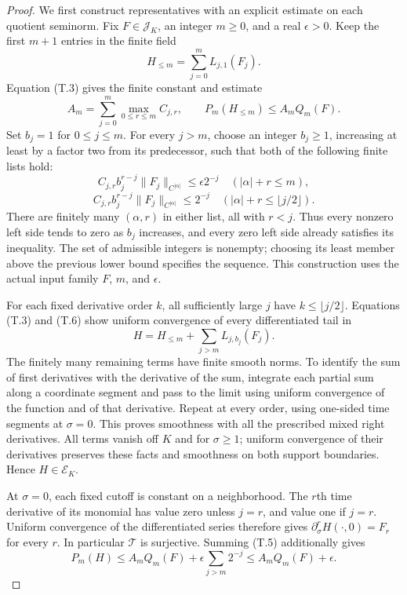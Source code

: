 \documentclass[10pt,a4paper]{article}
\newcounter{none}
\newcommand{\J}{\mathcal J_K}
\newcommand{\E}{\mathcal E_K}
\begin{document}
\begin{proof}
We first construct representatives with an explicit estimate on each quotient
seminorm. Fix $F\in\J$, an integer $m\ge0$, and a real $\epsilon>0$.
Keep the first $m+1$ entries in the finite field
\[
 H_{\le m}=\sum_{j=0}^m L_{j,1}(F_j).
\]
Equation (T.3) gives the finite constant and estimate
\[
 A_m=\sum_{j=0}^m\max_{0\le r\le m}C_{j,r},\qquad
 P_m(H_{\le m})\le A_mQ_m(F).
 \tag{T.4}
\]
Set $b_j=1$ for $0\le j\le m$. For every $j>m$, choose an integer $b_j\ge1$, increasing at least by a factor
two from its predecessor, such that both of the following finite lists hold:
\[
 C_{j,r}b_j^{r-j}\|F_j\|_{C^{|\alpha|}}
       \le\epsilon 2^{-j}\quad (|\alpha|+r\le m),
 \tag{T.5}
\]
\[
 C_{j,r}b_j^{r-j}\|F_j\|_{C^{|\alpha|}}
       \le2^{-j}\quad (|\alpha|+r\le\lfloor j/2\rfloor).
 \tag{T.6}
\]
There are finitely many $(\alpha,r)$ in either list, all with $r<j$.
Thus every nonzero left side tends to zero as $b_j$ increases, and every
zero left side already satisfies its inequality. The set of admissible
integers is nonempty; choosing its least member above the previous lower
bound specifies the sequence. This construction uses the actual input
family $F$, $m$, and $\epsilon$.

For each fixed derivative order $k$, all sufficiently large $j$ have
$k\le\lfloor j/2\rfloor$. Equations (T.3) and (T.6) show uniform
convergence of every differentiated tail in
\[
 H=H_{\le m}+\sum_{j>m}L_{j,b_j}(F_j).
 \tag{T.7}
\]
The finitely many remaining terms have finite smooth norms. To identify the
sum of first derivatives with the derivative of the sum, integrate each
partial sum along a coordinate segment and pass to the limit using uniform
convergence of the function and of that derivative. Repeat at every order,
using one-sided time segments at $\sigma=0$. This proves smoothness with all
the prescribed mixed right derivatives. All terms vanish off $K$ and for
$\sigma\ge1$; uniform convergence of their derivatives preserves these facts
and smoothness on both support boundaries. Hence $H\in\E$.

At $\sigma=0$, each fixed cutoff is constant on a neighborhood. The $r$th
time derivative of its monomial has value zero unless $j=r$, and value one
if $j=r$. Uniform convergence of the differentiated series therefore gives
$\partial_\sigma^rH(\cdot,0)=F_r$ for every $r$. In particular $\mathcal T$
is surjective. Summing (T.5) additionally gives
\[
 P_m(H)\le A_mQ_m(F)+\epsilon\sum_{j>m}2^{-j}
                    \le A_mQ_m(F)+\epsilon.
 \tag{T.8}
\]


\end{proof}
\end{document}
